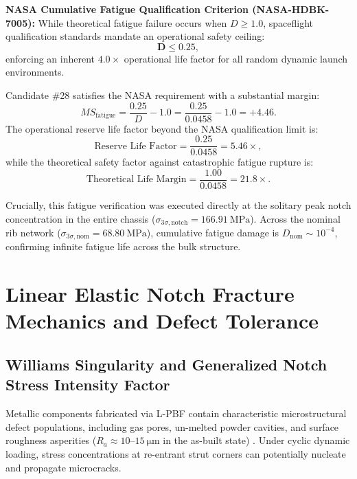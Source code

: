 \begin{svgraybox}
\textbf{NASA Cumulative Fatigue Qualification Criterion (NASA-HDBK-7005):}
While theoretical fatigue failure occurs when $D \ge 1.0$, spaceflight qualification standards mandate an operational safety ceiling:
\begin{equation}
\mathbf{D \le 0.25},
\label{eq:nasa_fatigue_ceiling}
\end{equation}
enforcing an inherent $4.0\times$ operational life factor for all random dynamic launch environments.
\end{svgraybox}

Candidate \#28 satisfies the NASA requirement with a substantial margin:
\begin{equation}
MS_{\text{fatigue}} = \frac{0.25}{D} - 1.0 = \frac{0.25}{0.0458} - 1.0 = \mathbf{+4.46}.
\label{eq:ms_fatigue}
\end{equation}
The operational reserve life factor beyond the NASA qualification limit is:
\begin{equation}
\text{Reserve Life Factor} = \frac{0.25}{0.0458} = \mathbf{5.46\times},
\label{eq:life_factor_nasa}
\end{equation}
while the theoretical safety factor against catastrophic fatigue rupture is:
\begin{equation}
\text{Theoretical Life Margin} = \frac{1.00}{0.0458} = \mathbf{21.8\times}.
\label{eq:life_factor_theoretical}
\end{equation}

Crucially, this fatigue verification was executed directly at the solitary peak notch concentration in the entire chassis ($\sigma_{3\sigma,\text{notch}} = \SI{166.91}{\mega\pascal}$). Across the nominal rib network ($\sigma_{3\sigma,\text{nom}} = \SI{68.80}{\mega\pascal}$), cumulative fatigue damage is $D_{\text{nom}} \sim 10^{-4}$, confirming infinite fatigue life across the bulk structure.

\section{Linear Elastic Notch Fracture Mechanics and Defect Tolerance}
\label{sec:lefm_fracture}

\subsection{Williams Singularity and Generalized Notch Stress Intensity Factor}

Metallic components fabricated via L-PBF contain characteristic microstructural defect populations, including gas pores, un-melted powder cavities, and surface roughness asperities ($R_a \approx 10\text{--}\SI{15}{\micro\meter}$ in the as-built state) \cite{collini2024,zhong2023}. Under cyclic dynamic loading, stress concentrations at re-entrant strut corners can potentially nucleate and propagate microcracks.

